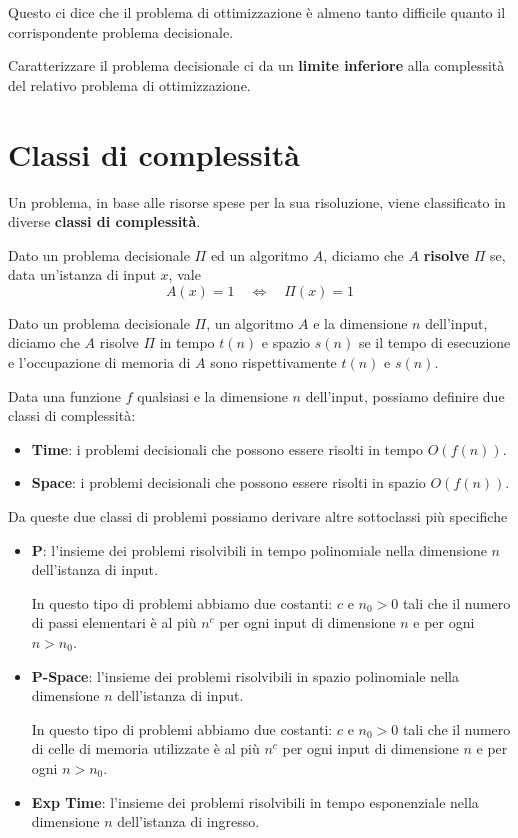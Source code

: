 Questo ci dice che il problema di ottimizzazione \`e almeno tanto difficile quanto il corrispondente problema
decisionale.

Caratterizzare il problema decisionale ci da un \textbf{limite inferiore} alla complessit\`a del relativo problema di
ottimizzazione.

\section{Classi di complessit\`a}\label{classi}
Un problema, in base alle risorse spese per la sua risoluzione, viene classificato in diverse
\textbf{classi di complessit\`a}.

\begin{theorem}
	Dato un problema decisionale $\Pi$ ed un algoritmo $A$, diciamo che $A$ \textbf{risolve} $\Pi$ se, data un'istanza di
	input $x$, vale
	\[ A(x) = 1 \quad \Leftrightarrow \quad \Pi(x) = 1 \]
\end{theorem}

\begin{theorem}
	Dato un problema decisionale $\Pi$, un algoritmo $A$ e la dimensione $n$ dell'input, diciamo che $A$ risolve $\Pi$
	in tempo $t(n)$ e spazio $s(n)$ se il tempo di esecuzione e l'occupazione di memoria di $A$ sono rispettivamente
	$t(n)$ e $s(n)$.
\end{theorem}

Data una funzione $f$ qualsiasi e la dimensione $n$ dell'input, possiamo definire due classi di complessit\`a:
\begin{itemize}
	\item \textbf{Time}: i problemi decisionali che possono essere risolti in tempo $O(f(n))$.
	\item \textbf{Space}: i problemi decisionali che possono essere risolti in spazio $O(f(n))$.
\end{itemize}
Da queste due classi di problemi possiamo derivare altre sottoclassi pi\`u specifiche
\begin{itemize}
	\item \textbf{P}: l'insieme dei problemi risolvibili in tempo polinomiale nella dimensione $n$ dell'istanza di input.

	      In questo tipo di problemi abbiamo due costanti: $c$ e $n_0 > 0$ tali che il numero di passi elementari \`e al
	      pi\`u $n^c$ per ogni input di dimensione $n$ e per ogni $n > n_0$.

	\item \textbf{P-Space}: l'insieme dei problemi risolvibili in spazio polinomiale nella dimensione $n$ dell'istanza
	      di input.

	      In questo tipo di problemi abbiamo due costanti: $c$ e $n_0 > 0$ tali che il numero di celle di memoria
	      utilizzate \`e al pi\`u $n^c$ per ogni input di dimensione $n$ e per ogni $n > n_0$.
	\item \textbf{Exp Time}: l'insieme dei problemi risolvibili in tempo esponenziale nella dimensione $n$ dell'istanza
	      di ingresso.
\end{itemize}

